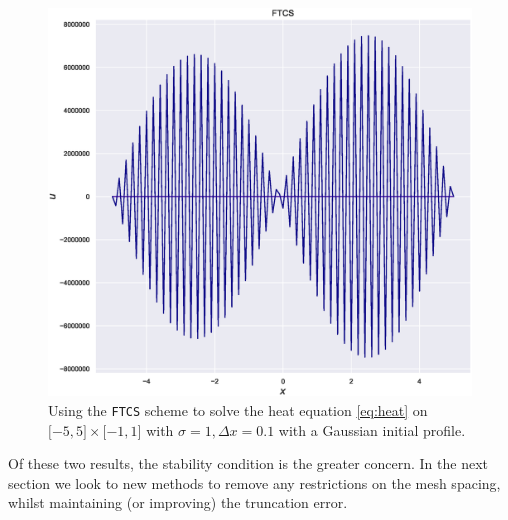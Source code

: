 \begin{figure}
\begin{minipage}[b]{0.49\textwidth}
            \includegraphics[width=\textwidth]{Figures/unstableFTCSheat.eps}
        \end{minipage} %
        \caption{Using the \texttt{FTCS} scheme to solve the heat equation \eqref{eq:heat} on $ \lbrack -5,5\rbrack \times\lbrack -1,1\rbrack$ with $\sigma =1, \Delta x = 0.1$ with a Gaussian initial profile.} 
        \label{fig:FTCSunstable}
    \end{figure}
    
    Of these two results, the stability condition is the greater concern. In the next section we look to new methods to remove any restrictions on the mesh spacing, whilst maintaining (or improving) the truncation error.
    
